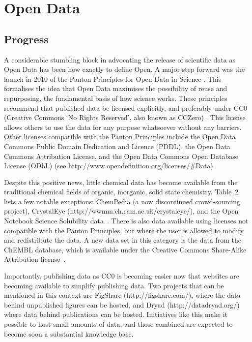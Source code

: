 \documentclass[10pt]{bmc_article}
\newenvironment{bmcformat}{\fussy\setboolean{publ}{true}}{\fussy}
\begin{document}
\begin{bmcformat}
\section*{Open Data}
  \subsection*{Progress}

A considerable stumbling block in advocating the release of scientific
data as Open Data has been how exactly to define Open. A major step
forward was the launch in 2010 of the Panton Principles for Open Data
in Science \cite{WebPanton}. This formalises the idea that Open Data maximises the
possibility of reuse and repurposing, the fundamental basis
of how science works. These principles recommend that published data
be licensed explicitly, and preferably under CC0 (Creative Commons `No
Rights Reserved', also known as CCZero) \cite{WebCC0}. This license allows others to use the
data for any purpose whatsoever without any barriers. Other licenses
compatible with the Panton Principles include the
Open Data Commons Public Domain Dedication and Licence (PDDL), the
Open Data Commons Attribution License, and the
Open Data Commons Open Database License (ODbL) (see
http://www.opendefinition.org/licenses/\#Data).

Despite this positive news, little chemical data has become
available from the traditional chemical fields of organic,
inorganic, solid state chemistry. Table~2 lists a few notable
exceptions: ChemPedia (a now discontinued crowd-sourcing project),
CrystalEye (http://wwmm.ch.cam.ac.uk/crystaleye/),
and the Open Notebook Science Solubility
data~\cite{ONS2010}. There is also data available using licenses
not compatible with the Panton Principles, but where the user
is allowed to modify and redistribute the data. A new data
set in this category is the data from the ChEMBL database,
which is available under the Creative Commons Share-Alike
Attribution license~\cite{Overington2009}.

Importantly, publishing data as CC0 is becoming easier now that
websites are becoming available to simplify publishing data. Two
projects that can be mentioned in this context are FigShare
(http://figshare.com/), where the data behind unpublished figures
can be hosted, and Dryad (http://datadryad.org/) where data
behind publications can be hosted. Initiatives like this make
it possible to host small amounts of data, and those combined
are expected to become soon a substantial knowledge base.


\end{bmcformat}
\end{document}
